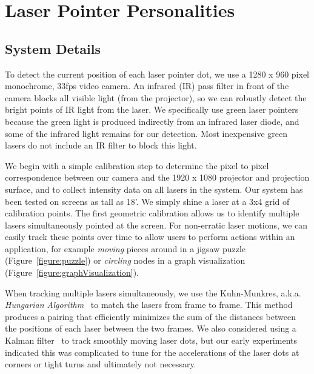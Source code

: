 \documentclass[review]{vgtc}                 %
\begin{document}
\section{Laser Pointer Personalities}
\label{section:LaserPersonalities}



\subsection{System Details}
\label{section:systemdetails}

To detect the current position of each laser pointer dot, we use a
1280 x 960 pixel monochrome, 33fps video camera.  An infrared (IR)
pass filter in front of the camera blocks all visible light (from the
projector), so we can robustly detect the bright points of IR light
from the laser.  We specifically use green laser pointers because the
green light is produced indirectly from an infrared laser diode, and
some of the infrared light remains for our detection.  Most
inexpensive green lasers do not include an IR filter to block this
light.

We begin with a simple
calibration step to determine the pixel to
pixel correspondence between our camera and the 1920 x 1080 projector
and 
projection surface, and to collect intensity data on all lasers in the system. Our system has been tested on screens as tall as 18'.
We simply shine a laser at a 3x4 grid of
calibration points.  The first geometric calibration
allows us to identify
multiple lasers simultaneously pointed at the screen.  For non-erratic
laser motions, we can easily track these points over time to allow
users to perform actions within an application, for example {\em
  moving} pieces around in a jigsaw puzzle (Figure~\ref{figure:puzzle}) or
{\em circling} nodes in a graph visualization (Figure~\ref{figure:graphVisualization}).

When tracking multiple lasers simultaneously, we use the Kuhn-Munkres,
a.k.a. {\em Hungarian
  Algorithm}~\cite{kuhn,munkres,munkres_implementation} to match the
lasers from frame to frame.  This method produces a pairing that
efficiently minimizes the sum of the distances between the positions
of each laser between the two frames.  We also considered using a
Kalman filter~\cite{Kalman} to track smoothly moving laser dots, but
our early experiments indicated this was complicated to tune for the
accelerations of the laser dots at corners or tight turns and
ultimately not necessary.
\end{document}
